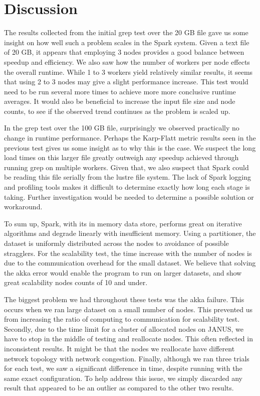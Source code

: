 \documentclass{article}
\begin{document}

\section{Discussion}
The results collected from the initial grep test over the 20 GB file gave us
some insight on how well such a problem scales in the Spark system. Given a
text file of 20 GB, it appears that employing 3 nodes provides a good balance
between speedup and efficiency. We also saw how the number of workers per node
effects the overall runtime. While 1 to 3 workers yield relatively similar
results, it seems that using 2 to 3 nodes may give a slight performance
increase. This test would need to be run several more times to achieve more
more conclusive runtime averages. It would also be beneficial to increase the
input file size and node counts, to see if the observed trend continues as the
problem is scaled up.

In the grep test over the 100 GB file, surprisingly we observed practically no
change in runtime performance. Perhaps the Karp-Flatt metric results seen in the
previous test gives us some insight as to why this is the case. We suspect the
long load times on this larger file greatly outweigh any speedup achieved
through running grep on multiple workers. Given that, we also suspect that
Spark could be reading this file serially from the lustre file system. The
lack of Spark logging and profiling tools makes it difficult to determine
exactly how long each stage is taking. Further investigation would be needed
to determine a possible solution or workaround.

To sum up, Spark, with its in memory data store, performs great on iterative
algorithms and degrade linearly with insufficient memory. Using a partitioner,
the dataset is uniformly distributed across the nodes to avoidance of possible
stragglers. For the scalability test, the time increase with the number of nodes
is due to the communication overhead for the small dataset. We believe that
solving the akka error would enable the program to run on larger datasets, and
show great scalability nodes counts of 10 and under. 

The biggest problem we had throughout these tests was the akka failure. This
occurs when we ran large dataset on a small number of nodes. This prevented us
from increasing the ratio of computing to communication for scalability test.
Secondly, due to the time limit for a cluster of allocated nodes on JANUS, we
have to stop in the middle of testing and reallocate nodes. This often
reflected in inconsistent results. It might be that the nodes we reallocate
have different network topology with network congestion. Finally, although we
ran three trials for each test, we saw a significant difference in time,
despite running with the same exact configuration. To help address this issue,
we simply discarded any result that appeared to be an outlier as compared to
the other two results.
\end{document}
